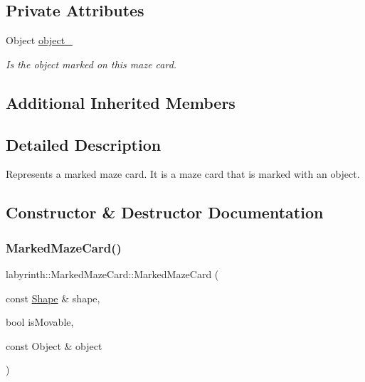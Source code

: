 \subsection*{Private Attributes}
\begin{DoxyCompactItemize}
\item 
\mbox{\label{classlabyrinth_1_1_marked_maze_card_a5536c82e5828a1bf1767b591f0dda289}} 
Object \mbox{\hyperlink{classlabyrinth_1_1_marked_maze_card_a5536c82e5828a1bf1767b591f0dda289}{object\+\_\+}}
\begin{DoxyCompactList}\small\item\em Is the object marked on this maze card. \end{DoxyCompactList}\end{DoxyCompactItemize}
\subsection*{Additional Inherited Members}


\subsection{Detailed Description}
Represents a marked maze card. It is a maze card that is marked with an object. 

\subsection{Constructor \& Destructor Documentation}
\mbox{\label{classlabyrinth_1_1_marked_maze_card_a0df55f80d2337e74be4bd7c8b9fabb85}} 
\subsubsection{\texorpdfstring{MarkedMazeCard()}{MarkedMazeCard()}}
{\footnotesize\ttfamily labyrinth\+::\+Marked\+Maze\+Card\+::\+Marked\+Maze\+Card (\begin{DoxyParamCaption}\item[{const \mbox{\hyperlink{structlabyrinth_1_1_maze_card_1_1_shape}{Shape}} \&}]{shape,  }\item[{bool}]{is\+Movable,  }\item[{const Object \&}]{object }\end{DoxyParamCaption})\hspace{0.3cm}{\ttfamily [inline]}}



